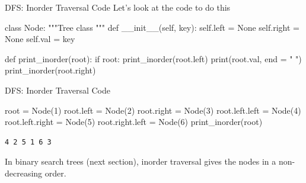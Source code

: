 \documentclass[
  ignorenonframetext,
]{beamer}
\newenvironment{Shaded}{\begin{snugshade}}{\end{snugshade}}
\newcommand{\BuiltInTok}[1]{\textcolor[rgb]{0.00,0.23,0.31}{#1}}
\newcommand{\CommentTok}[1]{\textcolor[rgb]{0.37,0.37,0.37}{#1}}
\newcommand{\ControlFlowTok}[1]{\textcolor[rgb]{0.00,0.23,0.31}{#1}}
\newcommand{\DecValTok}[1]{\textcolor[rgb]{0.68,0.00,0.00}{#1}}
\newcommand{\FunctionTok}[1]{\textcolor[rgb]{0.28,0.35,0.67}{#1}}
\newcommand{\KeywordTok}[1]{\textcolor[rgb]{0.00,0.23,0.31}{#1}}
\newcommand{\NormalTok}[1]{\textcolor[rgb]{0.00,0.23,0.31}{#1}}
\newcommand{\OperatorTok}[1]{\textcolor[rgb]{0.37,0.37,0.37}{#1}}
\newcommand{\StringTok}[1]{\textcolor[rgb]{0.13,0.47,0.30}{#1}}
\newcommand{\VariableTok}[1]{\textcolor[rgb]{0.07,0.07,0.07}{#1}}
\begin{document}
\begin{frame}[fragile]{DFS: Inorder Traversal Code}
\protect\hypertarget{dfs-inorder-traversal-code}{}
Let's look at the code to do this

\begin{Shaded}
\begin{Highlighting}[]
\KeywordTok{class}\NormalTok{ Node:}
  \CommentTok{"""Tree class}
\CommentTok{  """}
  \KeywordTok{def} \FunctionTok{\_\_init\_\_}\NormalTok{(}\VariableTok{self}\NormalTok{, key):}
    \VariableTok{self}\NormalTok{.left }\OperatorTok{=} \VariableTok{None}
    \VariableTok{self}\NormalTok{.right }\OperatorTok{=} \VariableTok{None}
    \VariableTok{self}\NormalTok{.val }\OperatorTok{=}\NormalTok{ key}
    
\KeywordTok{def}\NormalTok{ print\_inorder(root):}
  \ControlFlowTok{if}\NormalTok{ root:}
\NormalTok{    print\_inorder(root.left)}
    \BuiltInTok{print}\NormalTok{(root.val, end }\OperatorTok{=} \StringTok{" "}\NormalTok{)}
\NormalTok{    print\_inorder(root.right)}
\end{Highlighting}
\end{Shaded}
\end{frame}

\begin{frame}[fragile]{DFS: Inorder Traversal Code}
\protect\hypertarget{dfs-inorder-traversal-code-1}{}
\begin{Shaded}
\begin{Highlighting}[]
\NormalTok{root }\OperatorTok{=}\NormalTok{ Node(}\DecValTok{1}\NormalTok{)}
\NormalTok{root.left }\OperatorTok{=}\NormalTok{ Node(}\DecValTok{2}\NormalTok{)}
\NormalTok{root.right }\OperatorTok{=}\NormalTok{ Node(}\DecValTok{3}\NormalTok{)}
\NormalTok{root.left.left }\OperatorTok{=}\NormalTok{ Node(}\DecValTok{4}\NormalTok{)}
\NormalTok{root.left.right }\OperatorTok{=}\NormalTok{ Node(}\DecValTok{5}\NormalTok{)}
\NormalTok{root.right.left }\OperatorTok{=}\NormalTok{ Node(}\DecValTok{6}\NormalTok{)}
\NormalTok{print\_inorder(root)}
\end{Highlighting}
\end{Shaded}

\begin{verbatim}
4 2 5 1 6 3 
\end{verbatim}

In binary search trees (next section), inorder traversal gives the nodes
in a non-decreasing order.
\end{frame}
\end{document}
